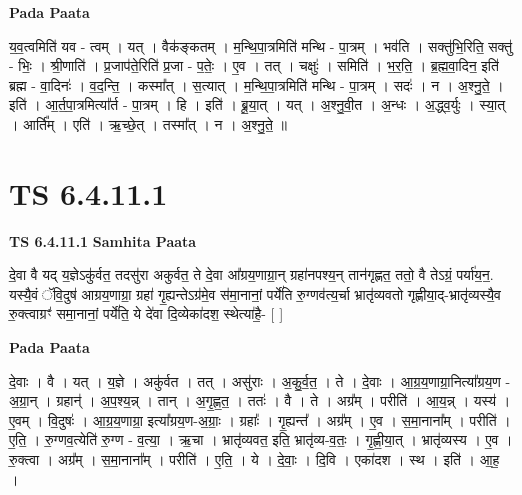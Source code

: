 \documentclass[17pt]{extarticle}
\begin{document}
\textbf{Pada Paata} \newline

य॒व॒त्वमिति॑ यव - त्वम् । यत् । वैक॑ङ्कतम् । म॒न्थि॒पा॒त्रमिति॑ मन्थि - पा॒त्रम् । भव॑ति । सक्तु॑भि॒रिति॒ सक्तु॑ - भिः॒ । श्री॒णाति॑ । प्र॒जाप॑ते॒रिति॑ प्र॒जा - प॒तेः॒ । ए॒व । तत् । चक्षुः॑ । समिति॑ । भ॒र॒ति॒ । ब्र॒ह्म॒वा॒दिन॒ इति॑ ब्रह्म - वा॒दिनः॑ । व॒द॒न्ति॒ । कस्मा᳚त् । स॒त्यात् । म॒न्थि॒पा॒त्रमिति॑ मन्थि - पा॒त्रम् । सदः॑ । न । अ॒श्नु॒ते॒ । इति॑ । आ॒र्त॒पा॒त्रमित्या᳚र्त - पा॒त्रम् । हि । इति॑ । ब्रू॒या॒त् । यत् । अ॒श्नु॒वी॒त । अ॒न्धः । अ॒द्ध्व॒र्युः । स्या॒त् । आर्ति᳚म् । एति॑ । ऋ॒च्छे॒त् । तस्मा᳚त् । न । अ॒श्नु॒ते॒ ॥  \newline




\section*{ TS 6.4.11.1 }

\textbf{TS 6.4.11.1 } \newline
\textbf{Samhita Paata} \newline

दे॒वा वै यद् य॒ज्ञेऽकु॑र्वत॒ तदसु॑रा अकुर्वत॒ ते दे॒वा आ᳚ग्रय॒णाग्रा॒न् ग्रहा॑नपश्य॒न् तान॑गृह्णत॒ ततो॒ वै तेऽग्रं॒ पर्या॑य॒न॒. यस्यै॒वं ॅवि॒दुष॑ आग्रय॒णाग्रा॒ ग्रहा॑ गृ॒ह्यन्तेऽग्र॑मे॒व स॑मा॒नानां॒ पर्ये॑ति रु॒ग्णव॑त्य॒र्चा भ्रातृ॑व्यवतो गृह्णीया॒द्-भ्रातृ॑व्यस्यै॒व रु॒क्त्वाग्रꣳ॑ समा॒नानां॒ पर्ये॑ति॒ ये दे॑वा दि॒व्येका॑दश॒ स्थेत्या॑है॒- [  ] \newline

\textbf{Pada Paata} \newline

दे॒वाः । वै । यत् । य॒ज्ञे । अकु॑र्वत । तत् । असु॑राः । अ॒कु॒र्व॒त॒ । ते । दे॒वाः । आ॒ग्र॒य॒णाग्रा॒नित्या᳚ग्रय॒ण - अ॒ग्रा॒न् । ग्रहान्॑ । अ॒प॒श्य॒न्न् । तान् । अ॒गृ॒ह्ण॒त॒ । ततः॑ । वै । ते । अग्र᳚म् । परीति॑ । आ॒य॒न्न् । यस्य॑ । ए॒वम् । वि॒दुषः॑ । आ॒ग्र॒य॒णाग्रा॒ इत्या᳚ग्रय॒ण-अ॒ग्राः॒ । ग्रहाः᳚ । गृ॒ह्यन्त᳚ । अग्र᳚म् । ए॒व । स॒मा॒नाना᳚म् । परीति॑ । ए॒ति॒ । रु॒ग्णव॒त्येति॑ रु॒ग्ण - व॒त्या॒ । ऋ॒चा । भ्रातृ॑व्यवत॒ इति॒ भ्रातृ॑व्य-व॒तः॒ । गृ॒ह्णी॒या॒त् । भ्रातृ॑व्यस्य । ए॒व । रु॒क्त्वा । अग्र᳚म् । स॒मा॒नाना᳚म् । परीति॑ । ए॒ति॒ । ये । दे॒वाः॒ । दि॒वि । एका॑दश । स्थ । इति॑ । आ॒ह॒ ।  \newline




\end{document}
